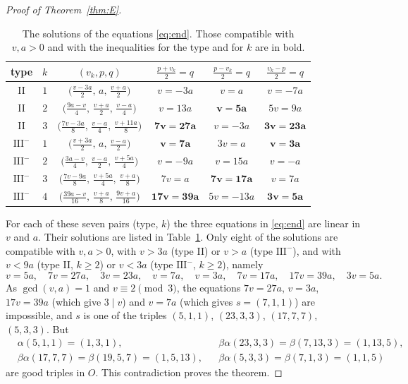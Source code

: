 \documentclass[11pt]{amsart}
\theoremstyle{definition}
\theoremstyle{remark}
\begin{document}
\begin{proof}[Proof of Theorem~\ref{thm:E}]
\begin{table}[ht]
\small\setlength{\tabcolsep}{5pt}
\begin{tabular}{cccccc}
type & $k$ & $(v_k,p,q)$ & $\tfrac{p+v_k}{2}=q$ & $\tfrac{p-v_k}{2}=q$ & $\tfrac{v_k-p}{2}=q$ \\[2pt] \hline
II & $1$ & $\bigl(\tfrac{v-3a}{2},\,a,\,\tfrac{v+a}{2}\bigr)$ & $v=-3a$ & $v=a$ & $v=-7a$ \rule{0pt}{14pt}\\[3pt]
II & $2$ & $\bigl(\tfrac{9a-v}{4},\,\tfrac{v+a}{2},\,\tfrac{v-a}{4}\bigr)$ & $v=13a$ & $\mathbf{v=5a}$ & $5v=9a$ \\[3pt]
II & $3$ & $\bigl(\tfrac{7v-3a}{8},\,\tfrac{v-a}{4},\,\tfrac{v+11a}{8}\bigr)$ & $\mathbf{7v=27a}$ & $v=-3a$ & $\mathbf{3v=23a}$ \\[3pt]
$\mathrm{III}^-$ & $1$ & $\bigl(\tfrac{v+3a}{2},\,a,\,\tfrac{v-a}{2}\bigr)$ & $\mathbf{v=7a}$ & $3v=a$ & $\mathbf{v=3a}$ \\[3pt]
$\mathrm{III}^-$ & $2$ & $\bigl(\tfrac{3a-v}{4},\,\tfrac{v-a}{2},\,\tfrac{v+5a}{4}\bigr)$ & $v=-9a$ & $v=15a$ & $v=-a$ \\[3pt]
$\mathrm{III}^-$ & $3$ & $\bigl(\tfrac{7v-9a}{8},\,\tfrac{v+5a}{4},\,\tfrac{v+a}{8}\bigr)$ & $7v=a$ & $\mathbf{7v=17a}$ & $v=7a$ \\[3pt]
$\mathrm{III}^-$ & $4$ & $\bigl(\tfrac{39a-v}{16},\,\tfrac{v+a}{8},\,\tfrac{9v+a}{16}\bigr)$ & $\mathbf{17v=39a}$ & $5v=-13a$ & $\mathbf{3v=5a}$
\end{tabular}
\vspace{4pt}
\caption{The solutions of the equations \eqref{eq:end}. Those compatible with $v,a>0$ and with the inequalities for the type and for $k$ are in bold.}\label{tab:eq}
\end{table}
For each of these seven pairs (type, $k$) the three equations in \eqref{eq:end} are linear in $v$ and $a$. Their solutions are listed in Table~\ref{tab:eq}.
Only eight of the solutions are compatible with $v,a>0$, with $v>3a$ (type II) or $v>a$ (type $\mathrm{III}^-$), and with $v<9a$ (type II, $k\ge 2$) or $v<3a$ (type $\mathrm{III}^-$, $k\ge 2$), namely
\[
v=5a,\quad 7v=27a,\quad 3v=23a,\quad v=7a,\quad v=3a,\quad 7v=17a,\quad 17v=39a,\quad 3v=5a .
\]
As $\gcd(v,a)=1$ and $v\equiv 2\pmod 3$, the equations $7v=27a$, $v=3a$, $17v=39a$ (which give $3\mid v$) and $v=7a$ (which gives $s=(7,1,1)$) are impossible,
and $s$ is one of the triples $(5,1,1)$, $(23,3,3)$, $(17,7,7)$, $(5,3,3)$. But
\begin{align*}
&\alpha(5,1,1)=(1,3,1), &&\beta\alpha(23,3,3)=\beta(7,13,3)=(1,13,5),\\
&\beta\alpha(17,7,7)=\beta(19,5,7)=(1,5,13), &&\beta\alpha(5,3,3)=\beta(7,1,3)=(1,1,5)
\end{align*}
are good triples in $O$. This contradiction proves the theorem.
\end{proof}
\end{document}
